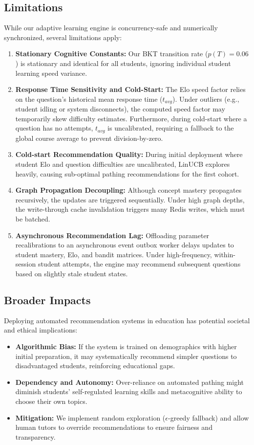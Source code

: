 \documentclass{article}
\begin{document}
\subsection{Limitations}
While our adaptive learning engine is concurrency-safe and numerically synchronized, several limitations apply:
\begin{enumerate}
    \item \textbf{Stationary Cognitive Constants:} Our BKT transition rate ($p(T) = 0.06$) is stationary and identical for all students, ignoring individual student learning speed variance.
    \item \textbf{Response Time Sensitivity and Cold-Start:} The Elo speed factor relies on the question's historical mean response time ($t_{avg}$). Under outliers (e.g., student idling or system disconnects), the computed speed factor may temporarily skew difficulty estimates. Furthermore, during cold-start where a question has no attempts, $t_{avg}$ is uncalibrated, requiring a fallback to the global course average to prevent division-by-zero.
    \item \textbf{Cold-start Recommendation Quality:} During initial deployment where student Elo and question difficulties are uncalibrated, LinUCB explores heavily, causing sub-optimal pathing recommendations for the first cohort.
    \item \textbf{Graph Propagation Decoupling:} Although concept mastery propagates recursively, the updates are triggered sequentially. Under high graph depths, the write-through cache invalidation triggers many Redis writes, which must be batched.
    \item \textbf{Asynchronous Recommendation Lag:} Offloading parameter recalibrations to an asynchronous event outbox worker delays updates to student mastery, Elo, and bandit matrices. Under high-frequency, within-session student attempts, the engine may recommend subsequent questions based on slightly stale student states.
\end{enumerate}

\subsection{Broader Impacts}
Deploying automated recommendation systems in education has potential societal and ethical implications:
\begin{itemize}
    \item \textbf{Algorithmic Bias:} If the system is trained on demographics with higher initial preparation, it may systematically recommend simpler questions to disadvantaged students, reinforcing educational gaps.
    \item \textbf{Dependency and Autonomy:} Over-reliance on automated pathing might diminish students' self-regulated learning skills and metacognitive ability to choose their own topics.
    \item \textbf{Mitigation:} We implement random exploration ($\epsilon$-greedy fallback) and allow human tutors to override recommendations to ensure fairness and transparency.
\end{itemize}
\end{document}
